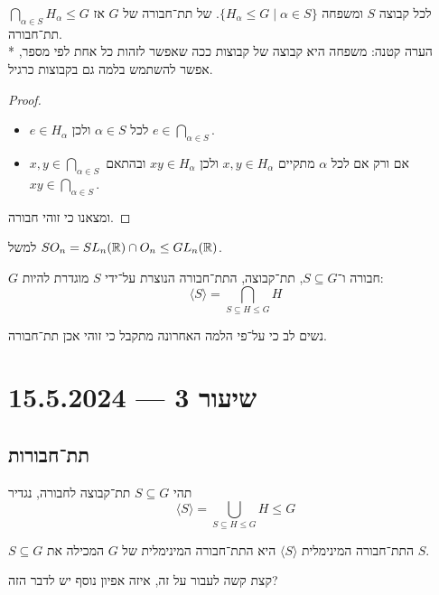 \begin{lemma}
	לכל קבוצה $S$ ומשפחה $\{ H_\alpha \le G \mid \alpha \in S\}$. של תת־חבורה של $G$ אז $\bigcap_{\alpha \in S} H_\alpha \le G$ תת־חבורה. \\*
	הערה קטנה: משפחה היא קבוצה של קבוצות ככה שאפשר לזהות כל אחת לפי מספר, אפשר להשתמש בלמה גם בקבוצות כרגיל.
\end{lemma}
\begin{proof}
	\begin{itemize}
		\item $e \in H_\alpha$ לכל $\alpha \in S$ ולכן $e \in \bigcap_{\alpha \in S}$.
		\item $x, y \in \bigcap_{\alpha \in S}$ אם ורק אם לכל $\alpha$ מתקיים $x, y \in H_\alpha$ ולכן $xy \in H_\alpha$ ובהתאם $xy \in \bigcap_{\alpha \in S}$.
	\end{itemize}
	ומצאנו כי זוהי חבורה.
\end{proof}
למשל $SO_n = SL_n(\mathbb{R}) \cap O_n \le GL_n(\mathbb{R})$.
\begin{definition}
	$G$ חבורה ו־$S \subseteq G$, תת־קבוצה, התת־חבורה הנוצרת על־ידי $S$ מוגדרת להיות:
	\[
		\langle S \rangle = \bigcap_{S \subseteq H \le G} H
	\]
\end{definition}
נשים לב כי על־פי הלמה האחרונה מתקבל כי זוהי אכן תת־חבורה.

\section{שיעור 3 --- 15.5.2024}
\subsection{תת־חבורות}
\begin{definition}
	תהי $S \subseteq G$ תת־קבוצה לחבורה, נגדיר
	\[
		\langle S \rangle = \bigcup_{S \subseteq H \le G} H \le G
	\]
\end{definition}
\begin{lemma}
	$S \subseteq G$ התת־חבורה המינימלית $\langle S \rangle$ היא התת־חבורה המינימלית של $G$ המכילה את $S$.
\end{lemma}
קצת קשה לעבור על זה, איזה אפיון נוסף יש לדבר הזה?

